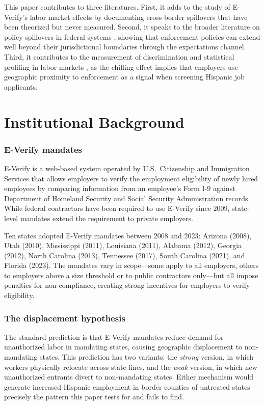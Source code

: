 \documentclass[12pt]{article}
\begin{document}
This paper contributes to three literatures. First, it adds to the study of E-Verify's labor market effects \citep{amuedo2020, bohn2014, good2016, orrenius2015} by documenting cross-border spillovers that have been theorized but never measured. Second, it speaks to the broader literature on policy spillovers in federal systems \citep{baicker2005, dube2010}, showing that enforcement policies can extend well beyond their jurisdictional boundaries through the expectations channel. Third, it contributes to the measurement of discrimination and statistical profiling in labor markets \citep{agan2018, doleac2020}, as the chilling effect implies that employers use geographic proximity to enforcement as a signal when screening Hispanic job applicants.

\section{Institutional Background}

\subsubsection*{E-Verify mandates} E-Verify is a web-based system operated by U.S.\ Citizenship and Immigration Services that allows employers to verify the employment eligibility of newly hired employees by comparing information from an employee's Form I-9 against Department of Homeland Security and Social Security Administration records. While federal contractors have been required to use E-Verify since 2009, state-level mandates extend the requirement to private employers.

Ten states adopted E-Verify mandates between 2008 and 2023: Arizona (2008), Utah (2010), Mississippi (2011), Louisiana (2011), Alabama (2012), Georgia (2012), North Carolina (2013), Tennessee (2017), South Carolina (2021), and Florida (2023). The mandates vary in scope---some apply to all employers, others to employers above a size threshold or to public contractors only---but all impose penalties for non-compliance, creating strong incentives for employers to verify eligibility.

\subsubsection*{The displacement hypothesis} The standard prediction is that E-Verify mandates reduce demand for unauthorized labor in mandating states, causing geographic displacement to non-mandating states. This prediction has two variants: the \textit{strong} version, in which workers physically relocate across state lines, and the \textit{weak} version, in which new unauthorized entrants divert to non-mandating states. Either mechanism would generate increased Hispanic employment in border counties of untreated states---precisely the pattern this paper tests for and fails to find.
\end{document}
